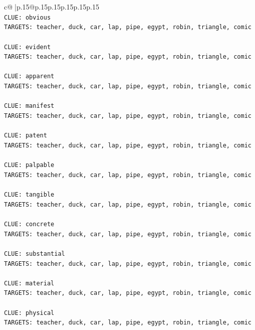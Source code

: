\documentclass{article}
\begin{document}
{\begin{supertabular}{c@{$\;$}|p{.15\linewidth}@{}p{.15\linewidth}p{.15\linewidth}p{.15\linewidth}p{.15\linewidth}p{.15\linewidth}}
{{{\\ 
\texttt{CLUE: obvious} \\
\texttt{TARGETS: teacher, duck, car, lap, pipe, egypt, robin, triangle, comic} \\
\\ 
\texttt{CLUE: evident} \\
\texttt{TARGETS: teacher, duck, car, lap, pipe, egypt, robin, triangle, comic} \\
\\ 
\texttt{CLUE: apparent} \\
\texttt{TARGETS: teacher, duck, car, lap, pipe, egypt, robin, triangle, comic} \\
\\ 
\texttt{CLUE: manifest} \\
\texttt{TARGETS: teacher, duck, car, lap, pipe, egypt, robin, triangle, comic} \\
\\ 
\texttt{CLUE: patent} \\
\texttt{TARGETS: teacher, duck, car, lap, pipe, egypt, robin, triangle, comic} \\
\\ 
\texttt{CLUE: palpable} \\
\texttt{TARGETS: teacher, duck, car, lap, pipe, egypt, robin, triangle, comic} \\
\\ 
\texttt{CLUE: tangible} \\
\texttt{TARGETS: teacher, duck, car, lap, pipe, egypt, robin, triangle, comic} \\
\\ 
\texttt{CLUE: concrete} \\
\texttt{TARGETS: teacher, duck, car, lap, pipe, egypt, robin, triangle, comic} \\
\\ 
\texttt{CLUE: substantial} \\
\texttt{TARGETS: teacher, duck, car, lap, pipe, egypt, robin, triangle, comic} \\
\\ 
\texttt{CLUE: material} \\
\texttt{TARGETS: teacher, duck, car, lap, pipe, egypt, robin, triangle, comic} \\
\\ 
\texttt{CLUE: physical} \\
\texttt{TARGETS: teacher, duck, car, lap, pipe, egypt, robin, triangle, comic} \\
\\ 
}}}
\end{supertabular}}
\end{document}
